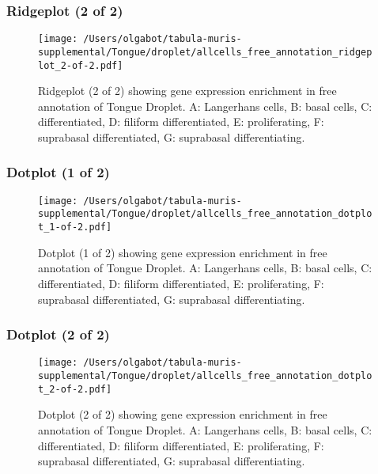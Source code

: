 \clearpage
\clearpage
\subsubsection{Ridgeplot (2 of 2)}
\begin{figure}[h]
\centering
\texttt{[image: /Users/olgabot/tabula-muris-supplemental/Tongue/droplet/allcells\_free\_annotation\_ridgeplot\_2-of-2.pdf]}

\caption{ Ridgeplot (2 of 2)  showing gene expression enrichment in free annotation of Tongue Droplet. A: Langerhans cells, B: basal cells, C: differentiated, D: filiform differentiated, E: proliferating, F: suprabasal differentiated, G: suprabasal differentiating.}
\end{figure}


\clearpage
\clearpage
\subsubsection{Dotplot (1 of 2)}
\begin{figure}[h]
\centering
\texttt{[image: /Users/olgabot/tabula-muris-supplemental/Tongue/droplet/allcells\_free\_annotation\_dotplot\_1-of-2.pdf]}

\caption{ Dotplot (1 of 2)  showing gene expression enrichment in free annotation of Tongue Droplet. A: Langerhans cells, B: basal cells, C: differentiated, D: filiform differentiated, E: proliferating, F: suprabasal differentiated, G: suprabasal differentiating.}
\end{figure}


\clearpage
\clearpage
\subsubsection{Dotplot (2 of 2)}
\begin{figure}[h]
\centering
\texttt{[image: /Users/olgabot/tabula-muris-supplemental/Tongue/droplet/allcells\_free\_annotation\_dotplot\_2-of-2.pdf]}

\caption{ Dotplot (2 of 2)  showing gene expression enrichment in free annotation of Tongue Droplet. A: Langerhans cells, B: basal cells, C: differentiated, D: filiform differentiated, E: proliferating, F: suprabasal differentiated, G: suprabasal differentiating.}
\end{figure}

